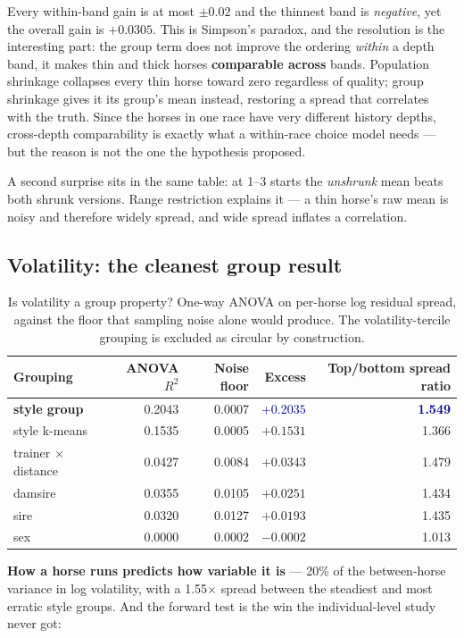 \documentclass[11pt,a4paper]{article}
\newcommand{\good}[1]{\textcolor{darkblue}{\textbf{#1}}}
\begin{document}
Every within-band gain is at most $\pm0.02$ and the thinnest band is
\emph{negative}, yet the overall gain is $+0.0305$. This is Simpson's paradox, and
the resolution is the interesting part: the group term does not improve the
ordering \emph{within} a depth band, it makes thin and thick horses
\textbf{comparable across} bands. Population shrinkage collapses every thin horse
toward zero regardless of quality; group shrinkage gives it its group's mean
instead, restoring a spread that correlates with the truth. Since the horses in
one race have very different history depths, cross-depth comparability is exactly
what a within-race choice model needs --- but the reason is not the one the
hypothesis proposed.

A second surprise sits in the same table: at 1--3 starts the \emph{unshrunk} mean
beats both shrunk versions. Range restriction explains it --- a thin horse's raw
mean is noisy and therefore widely spread, and wide spread inflates a correlation.

\subsection{Volatility: the cleanest group result}

\begin{table}[htbp]\centering\small
\caption{Is volatility a group property? One-way ANOVA on per-horse log residual
spread, against the floor that sampling noise alone would produce. The
volatility-tercile grouping is excluded as circular by construction.}
\begin{tabular}{lrrrr}
\toprule
Grouping & ANOVA $R^2$ & Noise floor & Excess & Top/bottom spread ratio\\
\midrule
\textbf{style group} & 0.2043 & 0.0007 & \good{$+0.2035$} & \good{1.549}\\
style k-means & 0.1535 & 0.0005 & $+0.1531$ & 1.366\\
trainer $\times$ distance & 0.0427 & 0.0084 & $+0.0343$ & 1.479\\
damsire & 0.0355 & 0.0105 & $+0.0251$ & 1.434\\
sire & 0.0320 & 0.0127 & $+0.0193$ & 1.435\\
sex & 0.0000 & 0.0002 & $-0.0002$ & 1.013\\
\bottomrule
\end{tabular}
\end{table}

\textbf{How a horse runs predicts how variable it is} --- 20\% of the between-horse
variance in log volatility, with a 1.55$\times$ spread between the steadiest and
most erratic style groups. And the forward test is the win the individual-level
study never got:
\end{document}
